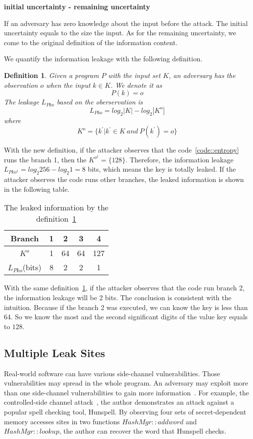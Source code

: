 \textbf{initial uncertainty - remaining uncertainty}

If an adversary has zero knowledge about the input before the attack. The initial uncertainty
equals to the size the input. As for the remaining uncertainty, we come to the original definition
of the information content.

We quantify the information leakage with the following definition. 

\newtheorem{mydef}{Definition}

\begin{mydef}
\label{def}
Given a program $P$ with the input set $K$, 
an adversary has the observation $o$ when the input $k{\in}K$. 
We denote it as
    $$P(k) = o$$
The leakage $L_{Pko}$ based on the oberservation is
    $$L_{Pko} = log_2{|K|} - log_2{|K^o|}$$
    where
    $$K^o = \{k^{'} | k^{'}{\in}K \ and \ P(k^{'}) = o \}$$
\end{mydef}

With the new definition, if the attacker observes that the code~\ref{code::entropy} runs the branch 1, 
then the $K^{o^{1}} = \{128\}$. Therefore, the information leakage $L_{Pko^{1}} = log_2{256} - log_2{1} = 8$
bits, which means the key is totally leaked. If the attacker observes the code runs other
branches, the leaked information is shown in the following table.

\begin{table}[h]
    \centering
    \begin{tabular}{|c|c|c|c|c|}
    \hline
    Branch & 1 & 2  & 3  & 4   \\ \hline
    $K^o$   & 1 & 64 & 64 & 127 \\ \hline
    $L_{Pko}$(bits)   & 8 & 2  & 2  & 1   \\ \hline
    \end{tabular}
    \caption{The leaked information by the definition~\ref{def}}
\end{table}

With the same definition~\ref{def}, if the attacker observes that the code run branch 2, the information
leakage will be 2 bits. The conclusion is consistent with the intuition. Because if the branch 2 was
executed, we can know the key is less than 64. So we know the most and the second significant digits of 
the value key equals to $128$.

\subsection{Multiple Leak Sites}
Real-world software can have various side-channel vulnerabilities. Those vulnerabilities 
may spread in the whole program. An adversary may exploit more than one side-channel vulnerabilities 
to gain more information~\cite{7163052, 191010}. For example, the controlled-side channel attack~\cite{7163052}, the author 
demonstrates an attack against a popular spell checking tool, Hunspell. By observing four sets 
of secret-dependent memory accesses sites in two functions $HashMgr::addword$ and $HashMgr::lookup$, 
the author can recover the word that Hunspell checks.

